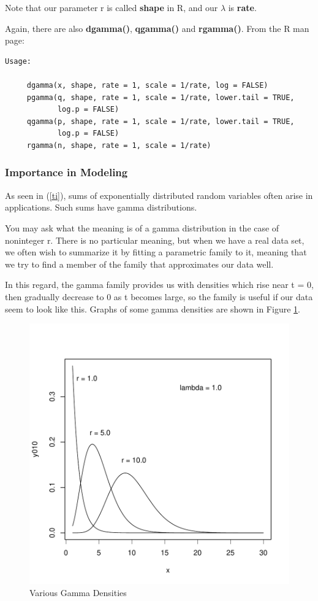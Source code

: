 Note that our parameter r is called {\bf shape} in R, and our $\lambda$
is {\bf rate}.

Again, there are also {\bf dgamma()}, {\bf qgamma()} and {\bf rgamma()}.
From the R man page:

\begin{lstlisting}
Usage:

     dgamma(x, shape, rate = 1, scale = 1/rate, log = FALSE)
     pgamma(q, shape, rate = 1, scale = 1/rate, lower.tail = TRUE,
            log.p = FALSE)
     qgamma(p, shape, rate = 1, scale = 1/rate, lower.tail = TRUE,
            log.p = FALSE)
     rgamma(n, shape, rate = 1, scale = 1/rate)
\end{lstlisting}

\subsubsection{Importance in Modeling}

As seen in (\ref{ti}), sums of exponentially distributed random
variables often arise in applications.  Such sums have gamma
distributions.

You may ask what the meaning is of a gamma distribution in the case of
noninteger r.  There is no particular meaning, but when we have a real
data set, we often wish to summarize it by fitting a parametric family
to it, meaning that we try to find a member of the family that
approximates our data well.

In this regard, the gamma family provides us with densities which rise
near t = 0, then gradually decrease to 0 as t becomes large, so the
family is useful if our data seem to look like this.  Graphs of some
gamma densities are shown in Figure \ref{gammas}.

\begin{figure}
\centerline{
\includegraphics[width=5.0in]{Gamma.pdf}
}
\caption{Various Gamma Densities}
\label{gammas}
\end{figure}

